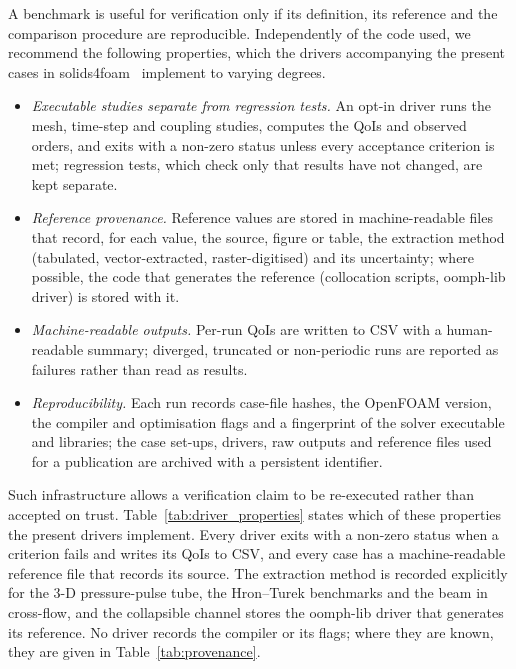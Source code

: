 A benchmark is useful for verification only if its definition, its reference and the comparison procedure are reproducible.
Independently of the code used, we recommend the following properties, which the drivers accompanying the present cases in solids4foam~\citep{Cardiff2025} implement to varying degrees.

\begin{itemize}
	\item \emph{Executable studies separate from regression tests.} An opt-in driver runs the mesh, time-step and coupling studies, computes the QoIs and observed orders, and exits with a non-zero status unless every acceptance criterion is met; regression tests, which check only that results have not changed, are kept separate.
	\item \emph{Reference provenance.} Reference values are stored in machine-readable files that record, for each value, the source, figure or table, the extraction method (tabulated, vector-extracted, raster-digitised) and its uncertainty; where possible, the code that generates the reference (collocation scripts, oomph-lib driver) is stored with it.
	\item \emph{Machine-readable outputs.} Per-run QoIs are written to CSV with a human-readable summary; diverged, truncated or non-periodic runs are reported as failures rather than read as results.
	\item \emph{Reproducibility.} Each run records case-file hashes, the OpenFOAM version, the compiler and optimisation flags and a fingerprint of the solver executable and libraries; the case set-ups, drivers, raw outputs and reference files used for a publication are archived with a persistent identifier.
\end{itemize}

Such infrastructure allows a verification claim to be re-executed rather than accepted on trust.
Table~\ref{tab:driver_properties} states which of these properties the present drivers implement. Every driver exits with a non-zero status when a criterion fails and writes its QoIs to CSV, and every case has a machine-readable reference file that records its source. The extraction method is recorded explicitly for the 3-D pressure-pulse tube, the Hron--Turek benchmarks and the beam in cross-flow, and the collapsible channel stores the oomph-lib driver that generates its reference. No driver records the compiler or its flags; where they are known, they are given in Table~\ref{tab:provenance}.


